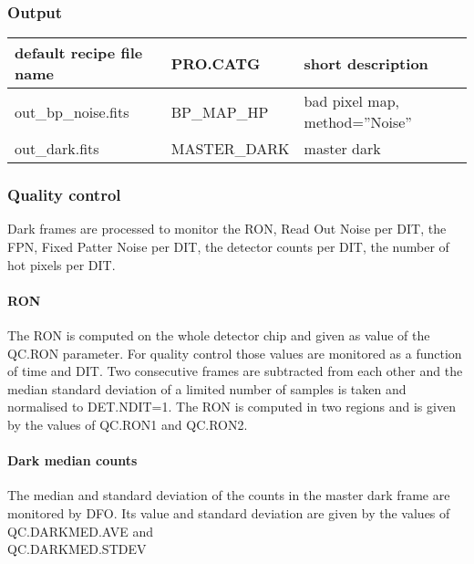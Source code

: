 \subsubsection{Output}

\begin{longtable}{|*3{l|}}
\hline
default recipe file name & PRO.CATG      & short description \\
\hline
out\_bp\_noise.fits      & BP\_MAP\_HP   & bad pixel map, method=''Noise'' \\
out\_dark.fits           & MASTER\_DARK  & master dark \\
\hline
\end{longtable}

\subsubsection{Quality control}

Dark frames are processed to monitor the RON, Read Out Noise per DIT, 
the FPN, Fixed Patter Noise per DIT, the detector counts per DIT, 
the number of hot pixels per DIT.



\paragraph{\bf RON}
The RON is computed on the whole detector chip and given as value of the QC.RON
parameter. For quality control those values are monitored as a 
function of time and DIT.
Two consecutive frames are subtracted from each other and the median 
standard deviation of a limited number of samples is taken and normalised to
DET.NDIT=1. The RON is computed in two regions and is given by the values of
QC.RON1 and QC.RON2.

\paragraph{Dark median counts}
The median and standard deviation of the counts in the master dark frame are
monitored by DFO. Its value and standard deviation are given by the values 
of QC.DARKMED.AVE and \\
QC.DARKMED.STDEV

